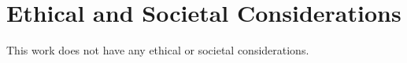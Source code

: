 \section{Ethical and Societal Considerations}

This work does not have any ethical or societal considerations.
